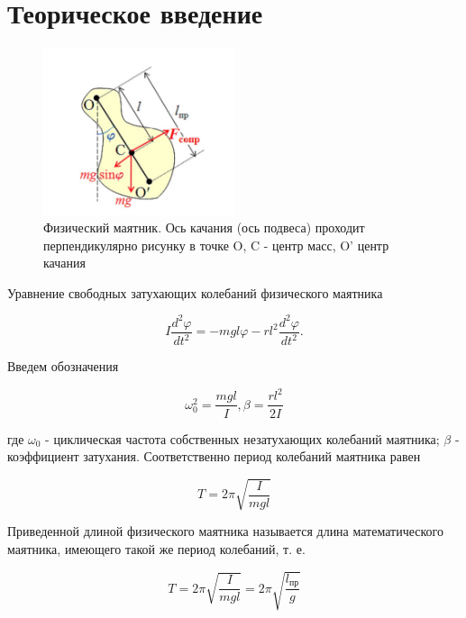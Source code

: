\documentclass[a4paper]{article}
\begin{document}
\section{\textbf{Теорическое введение}}



\begin{figure}[H]
    \centering
    \includegraphics[width=0.5\textwidth]{1.png}
    \caption{Физический маятник. Ось качания (ось подвеса) проходит перпендикулярно рисунку в точке O, C - центр масс, O' центр качания}
\end{figure}



Уравнение свободных затухающих колебаний физического маятника

\begin{equation}
I \frac{d^2 \varphi}{dt^2} = -mg l\varphi - rl^2 \frac{d^2 \varphi}{dt^2}.
\end{equation}

Введем обозначения

\begin{equation}
\omega_0^2 = \frac{mgl}{I}, \beta = \frac{rl^2}{2I}
\end{equation}

где $\omega_0$ - циклическая частота собственных незатухающих колебаний маятника; $\beta$ - коэффициент затухания. Соответственно период колебаний маятника равен

\begin{equation}
T = 2\pi \sqrt{\frac{I}{mgl}}
\end{equation}

Приведенной длиной физического маятника называется длина математического маятника, имеющего такой же период колебаний, т. е.

\begin{equation}
    T = 2\pi \sqrt{\frac{I}{mgl}} = 2\pi \sqrt{\frac{l_{\text{пр}}}{g}}
\end{equation}
\end{document}
